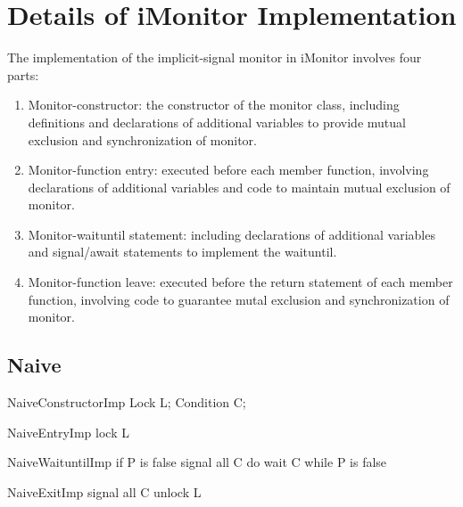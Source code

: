 \documentclass[preprint]{sigplanconf}
\begin{document}
\section{Details of iMonitor Implementation} \label{sec:imp}
The implementation of the implicit-signal monitor in iMonitor involves four 
parts:
\begin{enumerate}
  \item Monitor-constructor: the constructor of the monitor class, including 
    definitions and declarations of additional variables to provide mutual 
    exclusion and synchronization of monitor. 
  \item Monitor-function entry: executed before each member function, 
    involving declarations of additional variables and code to maintain
    mutual exclusion of monitor. 
  \item Monitor-waituntil statement: including declarations of additional
    variables and signal/await statements to implement the waituntil.
  \item Monitor-function leave: executed before the return statement of 
    each member function, involving code to guarantee mutal exclusion and 
    synchronization of monitor. 
\end{enumerate}



\subsection{Naive}

\begin{SaveVerbatim}{NaiveConstructorImp}
Lock L;
Condition C;
\end{SaveVerbatim}

\begin{SaveVerbatim}{NaiveEntryImp}
lock L 
\end{SaveVerbatim}

\begin{SaveVerbatim}{NaiveWaituntilImp}
if P is false
  signal all C
  do 
    wait C
  while P is false
\end{SaveVerbatim}

\begin{SaveVerbatim}{NaiveExitImp}
signal all C
unlock L
\end{SaveVerbatim}
\end{document}
